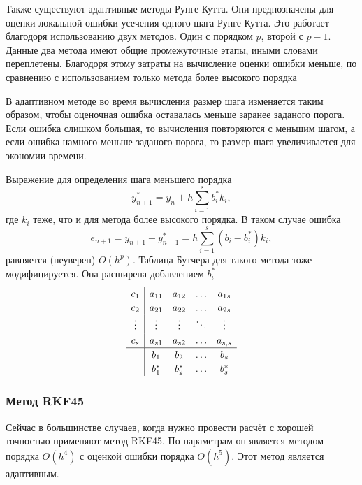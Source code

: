 \documentclass[a4paper,12pt]{article}
\begin{document}
	Также существуют адаптивные методы Рунге-Кутта. Они преднозначены для оценки локальной ошибки усечения одного шага Рунге-Кутта. Это работает благодоря использованию двух методов. Один с порядком \(p\), второй с \(p-1\). Данные два метода имеют общие промежуточные этапы, иными словами переплетены. Благодоря этому затраты на вычисление оценки ошибки меньше, по сравнению с использованием только метода более высокого порядка 

	В адаптивном методе во время вычисления размер шага изменяется таким образом, чтобы оценочная ошибка оставалась меньше заранее заданого порога. Если ошибка слишком большая, то вычисления повторяются с меньшим шагом, а если ошибка намного меньше заданого порога, то размер шага увеличивается для экономии времени.

	Выражение для определения шага меньшего порядка
	\begin{equation}\label{eq:2} 
		y_{n+1}^{*}=y_n+h\sum_{i=1}^{s}b_i^{*}k_i,
	\end{equation}
	где \(k_i\) теже, что и для метода более высокого порядка. В таком случае ошибка
	\begin{equation}\label{eq:2} 
		e_{n+1}=y_{n+1}-y_{n+1}^{*}=h\sum_{i=1}^{s}(b_i-b_i^{*})k_i,
	\end{equation}
	равняется (неуверен) \(O(h^p)\). Таблица Бутчера для такого метода тоже модифицируется. Она расширена добавлением \(b_i^{*}\)
	\[
	\renewcommand\arraystretch{1.2}
	\begin{array}
		{c|ccccc}
		c_1 &a_{11} &a_{12} &\ldots &a_{1s}\\
		c_2 &a_{21} &a_{22}&\ldots&a_{2s}\\
		\vdots &\vdots &\vdots &\ddots &\vdots\\
		c_s& a_{s1} &a_{s2} &\ldots &a_{s,s}\\
		\hline
		& b_1 &b_2 &\ldots &b_{s}\\
		& b_1^{*} &b_2^{*} &\ldots &b_{s}^{*}
	\end{array}
	\]

	\subsubsection{Метод RKF45}
	
	Сейчас в большинстве случаев, когда нужно провести расчёт с хорошей точностью применяют метод RKF45. По параметрам он является методом порядка \(O(h^4)\) с оценкой ошибки порядка  \(O(h^5)\). Этот метод является адаптивным.
\end{document}
